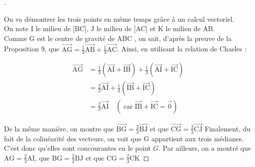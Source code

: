 \documentclass[12pt]{article}
\theoremstyle{break}
\newenvironment{demo}[1][\proofname]{%
  \begin{proof}[#1]$ $\newline
  }{%
  \end{proof}
}
\begin{document}
\begin{demo}
On va démontrer les trois points en même temps grâce à un calcul vectoriel.\\[0pt]
On note I le milieu de [BC], J le milieu de [AC] et K le milieu de AB.\\
Comme G est le centre de gravité de ABC , on sait, d'après la preuve de la Proposition 9, que $\overrightarrow{\mathrm{AG}}=\frac{1}{3} \overrightarrow{\mathrm{AB}}+\frac{1}{3} \overrightarrow{\mathrm{AC}}$. Ainsi, en utilisant la relation de Chasles :

$$
\begin{aligned}
  \overrightarrow{\mathrm{AG}} & =\frac{1}{3}(\overrightarrow{\mathrm{AI}}+\overrightarrow{\mathrm{IB}})+\frac{1}{3}(\overrightarrow{\mathrm{AI}}+\overrightarrow{\mathrm{IC}}) \\
  & =\frac{2}{3} \overrightarrow{\mathrm{AI}}+\frac{1}{3}(\overrightarrow{\mathrm{IB}}+\overrightarrow{\mathrm{IC}}) \\
  & =\frac{2}{3} \overrightarrow{\mathrm{AI}} \quad(\operatorname{car} \overrightarrow{\mathrm{IB}}+\overrightarrow{\mathrm{IC}}=\overrightarrow{0})
\end{aligned}
$$

De la même manière, on montre que $\overrightarrow{\mathrm{BG}}=\frac{2}{3} \overrightarrow{\mathrm{BJ}}$ et que $\overrightarrow{\mathrm{CG}}=\frac{2}{3} \overrightarrow{\mathrm{CJ}}$ Finalement, du fait de la colinéarité des vecteurs, on voit que G appartient aux trois médianes. C'est donc qu'elles sont concourantes en le point $G$. Par ailleurs, on a montré que $\mathrm{AG}=\frac{2}{3} \mathrm{AI}$, que $\mathrm{BG}=\frac{2}{3} \mathrm{BJ}$ et que $\mathrm{CG}=\frac{2}{3} \mathrm{CK}$
\end{demo}
\end{document}
